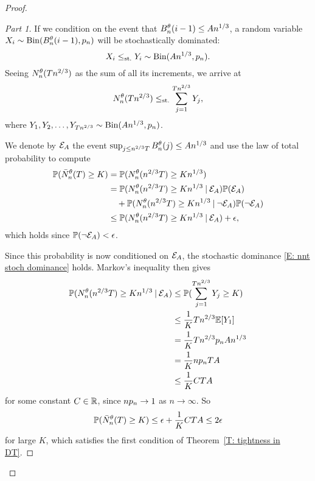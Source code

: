 \begin{proof}
\begin{proof}[Part 1]
If we condition on the event that $B_n^{\theta}(i-1) \leq An^{1 / 3}$, a random variable $X_i \sim \operatorname*{Bin}(B_n^{\theta}(i-1), p_n)$ will be stochastically dominated:
\begin{equation}
X_i \leq_{\text{st.}} Y_i \sim \operatorname*{Bin}(An^{1 / 3}, p_n).
\end{equation}
Seeing $N_n^{\theta}(Tn^{2 / 3})$ as the sum of all its increments, we arrive at
\begin{equation} \label{E: nnt stoch dominance}
N_n^{\theta}(Tn^{2 / 3}) \leq_{\text{st.}} \sum_{j=1}^{Tn^{2 / 3}} Y_j,
\end{equation}
where $Y_1, Y_2, \dots, Y_{Tn^{2 / 3}} \sim \operatorname*{Bin}(An^{1 / 3}, p_n)$.

We denote by $\mathcal{E}_{A}$ the event $\sup_{j \leq n^{2 / 3}T} B_n^{\theta}(j) \leq An^{1 / 3}$ and use the law of total probability to compute
\begin{equation} \label{E: First Total Probability Argument}
\begin{aligned}
\mathbb{P}(\bar{N}_n^{\theta}(T) \geq K) 
&= \mathbb{P}(N_n^{\theta}(n^{2 / 3}T) \geq Kn^{1 / 3}) \\
&=  \mathbb{P}(N_n^{\theta}(n^{2 / 3}T) \geq Kn^{1 / 3} \: | \: \mathcal{E}_{A}) \mathbb{P}(\mathcal{E}_{A}) \\
&\quad + \mathbb{P}(N_n^{\theta}(n^{2 / 3}T) \geq Kn^{1 / 3} \: | \: \neg\mathcal{E}_{A}) \mathbb{P}(\neg \mathcal{E}_{A}) \\
&\leq \mathbb{P}(N_n^{\theta}(n^{2 / 3}T) \geq Kn^{1 / 3} \: | \: \mathcal{E}_{A}) + \epsilon, \\
\end{aligned}	
\end{equation}
which holds since $\mathbb{P}(\neg\mathcal{E}_{A}) <\epsilon$.

Since this probability is now conditioned on $\mathcal{E}_{A}$, the stochastic dominance \eqref{E: nnt stoch dominance} holds.
Markov's inequality then gives
\begin{align*}
\mathbb{P}(N_n^{\theta}(n^{2 / 3}T) \geq Kn^{1 / 3} \: | \: \mathcal{E}_{A}) 
&\leq \mathbb{P}( \sum_{j=1}^{Tn^{2 / 3}} Y_j \geq K) \\
&\leq \frac{1}{K}Tn^{2 / 3} \mathbb{E}[Y_1] \\
&= \frac{1}{K}Tn^{2 / 3} p_n An^{1 / 3} \\
&= \frac{1}{K}np_n TA \\
&\leq \frac{1}{K}CTA
\end{align*}
for some constant $C \in \mathbb{R}$, since $np_n \rightarrow 1$ as $n \rightarrow \infty$.
So
\begin{equation}
\mathbb{P}(\bar{N}_n^{\theta}(T) \geq K) \leq \epsilon + \frac{1}{K}CTA \leq 2 \epsilon
\end{equation}
for large $K$, which satisfies the first condition of Theorem~\ref{T: tightness in DT}.


\end{proof}
\end{proof}
